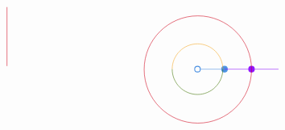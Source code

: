 \documentclass[12pt]{article}
\begin{document}
\[\begin{tikzpicture}[x=0.75pt,y=0.75pt,yscale=-1,xscale=1]
    \draw [color={rgb, 255:red, 74; green, 144; blue, 226 }  ,draw opacity=1 ]   (373.7,134.06) -- (403.35,134.06) ;
    \draw [shift={(403.35,134.06)}, rotate = 0] [color={rgb, 255:red, 74; green, 144; blue, 226 }  ,draw opacity=1 ][fill={rgb, 255:red, 74; green, 144; blue, 226 }  ,fill opacity=1 ][line width=0.75]      (0, 0) circle [x radius= 3.35, y radius= 3.35]   ;
    \draw [shift={(371.35,134.06)}, rotate = 0] [color={rgb, 255:red, 74; green, 144; blue, 226 }  ,draw opacity=1 ][line width=0.75]      (0, 0) circle [x radius= 3.35, y radius= 3.35]   ;
    \draw [color={rgb, 255:red, 144; green, 19; blue, 254 }  ,draw opacity=1 ]   (435.35,134.06) -- (467.35,134.06) ;
    \draw [shift={(435.35,134.06)}, rotate = 0] [color={rgb, 255:red, 144; green, 19; blue, 254 }  ,draw opacity=1 ][fill={rgb, 255:red, 144; green, 19; blue, 254 }  ,fill opacity=1 ][line width=0.75]      (0, 0) circle [x radius= 3.35, y radius= 3.35]   ;
    \draw [color={rgb, 255:red, 144; green, 19; blue, 254 }  ,draw opacity=1 ]   (403.35,134.06) -- (435.35,134.06) ;
    \draw  [draw opacity=0] (341.35,134.06) .. controls (341.35,134.06) and (341.35,134.06) .. (341.35,134.06) .. controls (341.35,117.49) and (354.78,104.06) .. (371.35,104.06) .. controls (387.92,104.06) and (401.35,117.49) .. (401.35,134.06) .. controls (401.35,134.06) and (401.35,134.06) .. (401.35,134.06) -- (371.35,134.06) -- cycle ; \draw [color={rgb, 255:red, 245; green, 166; blue, 35 }  ,draw opacity=1 ]   (341.35,134.06) .. controls (341.35,117.49) and (354.78,104.06) .. (371.35,104.06) .. controls (387.92,104.06) and (401.35,117.49) .. (401.35,134.06) ;  
    \draw  [draw opacity=0] (401.35,134.06) .. controls (401.35,134.06) and (401.35,134.06) .. (401.35,134.06) .. controls (401.35,150.63) and (387.92,164.06) .. (371.35,164.06) .. controls (354.78,164.06) and (341.35,150.63) .. (341.35,134.06) .. controls (341.35,134.06) and (341.35,134.06) .. (341.35,134.06) -- (371.35,134.06) -- cycle ; \draw [color={rgb, 255:red, 65; green, 117; blue, 5 }  ,draw opacity=1 ]   (401.35,134.06) .. controls (401.35,150.63) and (387.92,164.06) .. (371.35,164.06) .. controls (354.78,164.06) and (341.35,150.63) .. (341.35,134.06) ;  
    \draw [color={rgb, 255:red, 208; green, 2; blue, 27 }  ,draw opacity=1 ]   (145.63,60.46) -- (145.63,130.39) ;
    \draw  [color={rgb, 255:red, 208; green, 2; blue, 27 }  ,draw opacity=1 ] (308.15,134.46) .. controls (308.15,99.34) and (336.63,70.86) .. (371.75,70.86) .. controls (406.88,70.86) and (435.35,99.34) .. (435.35,134.46) .. controls (435.35,169.59) and (406.88,198.06) .. (371.75,198.06) .. controls (336.63,198.06) and (308.15,169.59) .. (308.15,134.46) -- cycle ;
    

\end{tikzpicture}\]
\end{document}
